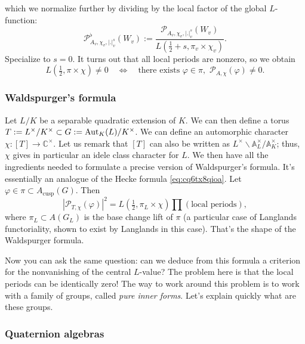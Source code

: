 \documentclass[reqno]{amsart} 
\numberwithin{theorem}{section}
\numberwithin{equation}{section}
\numberwithin{exercise}{section}
\begin{document}
which we normalize further by dividing by the local factor of the global $L$-function:
\begin{equation*}
  \mathcal{P}_{A_v, \chi_v, \lvert . \rvert_v^s}^\flat(W_v) :=
  \frac{\mathcal{P}_{A_v, \chi_v, \lvert . \rvert_v^s}(W_v)}{L(\tfrac{1}{2} + s, \pi_v \times \chi_v)}.
\end{equation*}
Specialize to $s = 0$.  It turns out that all local periods are nonzero, so we obtain
\begin{equation*}
  L(\tfrac{1}{2}, \pi \times \chi) \neq 0
  \quad \iff \quad
  \text{there exists } \varphi \in \pi, \, \, \mathcal{P}_{A, \chi}(\varphi) \neq 0.
\end{equation*}

\subsubsection{Waldspurger's formula}

Let $L /K$ be a separable quadratic extension of $K$.  We can then define a torus $T := L^\times / K^\times \subset G := \operatorname{Aut}_K(L) / K^\times$.  We can define an automorphic character $\chi :[T] \rightarrow \mathbb{C}^\times$.  Let us remark that $[T]$ can also be written as $L^\times \backslash \mathbb{A}_L^\times / \mathbb{A}_K^\times$; thus, $\chi$ gives in particular an idele class character for $L$.  We then have all the ingredients needed to formulate a precise version of Waldspurger's formula.  It's essentially an analogue of the Hecke formula \eqref{eq:cq6tx8qioa}.  Let $\varphi \in \pi \subset A_{\mathrm{cusp}}(G)$.  Then
\begin{equation*}
  \left\lvert \mathcal{P}_{T, \chi}(\varphi) \right\rvert^2
  =
  L(\tfrac{1}{2}, \pi_L \times \chi) \prod(\text{local periods}),
\end{equation*}
where $\pi_L \subset A(G_L)$ is the base change lift of $\pi$ (a particular case of Langlands functoriality, shown to exist by Langlands in this case).  That's the shape of the Waldspurger formula.

Now you can ask the same question: can we deduce from this formula a criterion for the nonvanishing of the central $L$-value?  The problem here is that the local periods can be identically zero!  The way to work around this problem is to work with a family of groups, called \emph{pure inner forms}.  Let's explain quickly what are these groups.

\subsubsection{Quaternion algebras}
\end{document}
